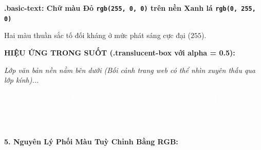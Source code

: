 \documentclass[11pt,oneside]{book}
\newcommand{\codeinline}[1]{\textcolor{accentOrange}{\texttt{#1}}}
\begin{document}
\begin{browserWindow}
\sffamily\small
\begin{tcolorbox}[enhanced, colback=white, colframe=primaryBlue!25, arc=6pt, boxrule=0.8pt, top=8pt, bottom=8pt, left=10pt, right=10pt]
  \begin{tcolorbox}[enhanced, colback=green!15, colframe=green!60!black, arc=4pt, boxrule=0.8pt, top=6pt, bottom=6pt, left=8pt, right=8pt]
    \textcolor{red!80!black}{\bfseries .basic-text: Chữ màu Đỏ \codeinline{rgb(255, 0, 0)} trên nền Xanh lá \codeinline{rgb(0, 255, 0)}}\par
    \textcolor{gray!70!black}{\scriptsize Hai màu thuần sắc tố đối kháng ở mức phát sáng cực đại ($255$).}
  \end{tcolorbox}
  \vspace{6pt}
  \begin{tcolorbox}[enhanced, colback=slateBg, colframe=gray!30, arc=5pt, boxrule=0.8pt, top=8pt, bottom=8pt, left=10pt, right=10pt]
    \textcolor{gray!80!black}{\scriptsize\bfseries HIỆU ỨNG TRONG SUỐT (.translucent-box với alpha = 0.5):}\par\vspace{3pt}
    {\color{gray!60}\itshape Lớp văn bản nền nằm bên dưới (Bối cảnh trang web có thể nhìn xuyên thấu qua lớp kính)...}\par\vspace{4pt}
    \begin{tcolorbox}[enhanced, colback=primaryBlue!50, colframe=primaryBlue, arc=4pt, boxrule=1pt, top=6pt, bottom=6pt, left=8pt, right=8pt]
      \textcolor{white}{\bfseries .translucent-box \{ background-color: rgba(0, 0, 255, 0.5); \}}\par
      \textcolor{white}{\scriptsize Kênh Alpha $0.5$ ($50\%$) tạo hiệu ứng bán trong suốt mờ ảo, nhìn xuyên thấu nền bên dưới.}
    \end{tcolorbox}
  \end{tcolorbox}
\end{tcolorbox}
\end{browserWindow}

\textbf{5. Nguyên Lý Phối Màu Tuỳ Chỉnh Bằng RGB:}
\end{document}
